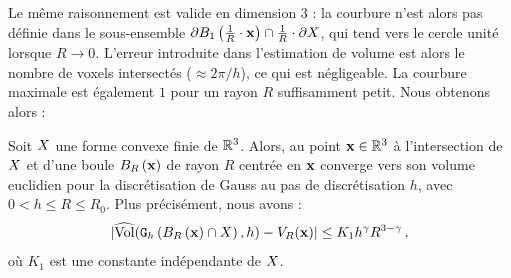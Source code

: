 Le même raisonnement est valide en dimension 3 : la courbure n'est alors pas
définie dans le sous-ensemble $\BT \Ball{1}{\frac{1}{R} \cdot \vx} \cap \frac{1}{R}
\cdot \dS$, qui tend vers le cercle unité lorsque $R \rightarrow 0$. L'erreur
introduite dans l'estimation de volume est alors le nombre de voxels intersectés
($\approx 2\pi/h$), ce qui est négligeable. La courbure maximale est également
$1$ pour un rayon $R$ suffisamment petit. Nous obtenons alors :
%
\begin{theorem}{}
  \label{thm:convergence-volume-intersection}
  Soit $\Shape$ une forme convexe finie de $\R^3$. Alors,  au point $\vx \in \R^3$ à l'intersection de $\Shape$ et
  d'une boule $\Ball{R}{\vx}$ de rayon $R$ centrée en $\vx$ converge vers son
  volume euclidien pour la discrétisation de Gauss au pas de discrétisation $h$,
  avec $0 < h \le R \le R_0$. Plus précisément, nous avons :
  \begin{equation}\label{eq:convergence-volume-intersection}
    | \VolC(\DigF{\Ball{R}{\vx} \cap \Shape}{h}, h) - V_R(\vx) | \le K_1 h^\gamma R^{3-\gamma} \,,
  \end{equation}
  où $K_1$ est une constante indépendante de $\Shape$.
\end{theorem}
%
